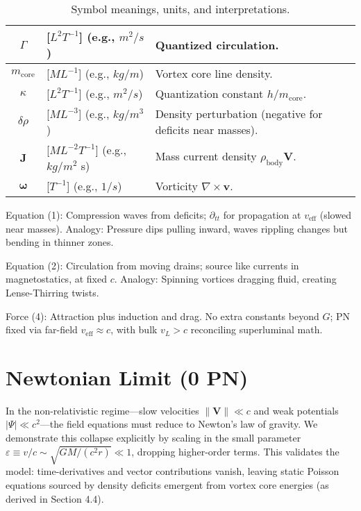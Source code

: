 \documentclass{article}
\begin{document}
\begin{table}[h!]
\begin{tabularx}{\textwidth}{|c|Y|Y|}
\hline
$\Gamma$ & [$L^2 T^{-1}$] (e.g., $m^2/s$) & Quantized circulation. \\
\hline
$m_{\text{core}}$ & [$M L^{-1}$] (e.g., $kg/m$) & Vortex core line density. \\
\hline
$\kappa$ & [$L^2 T^{-1}$] (e.g., $m^2/s$) & Quantization constant $h / m_{\text{core}}$. \\
\hline
$\delta \rho$ & [$M L^{-3}$] (e.g., $kg/m^3$) & Density perturbation (negative for deficits near masses). \\
\hline
$\mathbf{J}$ & [$M L^{-2} T^{-1}$] (e.g., $kg/m^2$ s) & Mass current density $\rho_{\text{body}} \mathbf{V}$.\protect\footnotemark \\
\hline
$\boldsymbol{\omega}$ & [$T^{-1}$] (e.g., $1/s$) & Vorticity $\nabla \times \mathbf{v}$. \\
\hline
\end{tabularx}
\caption{Symbol meanings, units, and interpretations.\protect\footnotemark}
\end{table}



Equation (1): Compression waves from deficits; $\partial_{tt}$ for propagation at $v_{\text{eff}}$ (slowed near masses). Analogy: Pressure dips pulling inward, waves rippling changes but bending in thinner zones.

Equation (2): Circulation from moving drains; source like currents in magnetostatics, at fixed $c$. Analogy: Spinning vortices dragging fluid, creating Lense-Thirring twists.

Force (4): Attraction plus induction and drag. No extra constants beyond $G$; PN fixed via far-field $v_{\text{eff}} \approx c$, with bulk $v_L > c$ reconciling superluminal math.

\section{Newtonian Limit (0 PN)}

In the non-relativistic regime---slow velocities $\|\mathbf{V}\| \ll c$ and weak potentials $|\Psi| \ll c^2$---the field equations must reduce to Newton's law of gravity. We demonstrate this collapse explicitly by scaling in the small parameter $\varepsilon \equiv v/c \sim \sqrt{GM/(c^2 r)} \ll 1$, dropping higher-order terms. This validates the model: time-derivatives and vector contributions vanish, leaving static Poisson equations sourced by density deficits emergent from vortex core energies (as derived in Section 4.4).
\end{document}
